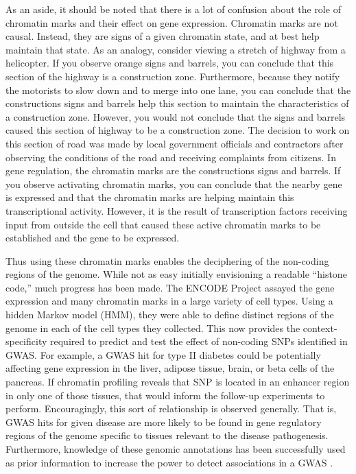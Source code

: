 As an aside, it should be noted that there is a lot of confusion about
the role of chromatin marks and their effect on gene
expression. Chromatin marks are not causal. Instead, they are signs of
a given chromatin state, and at best help maintain that state. As an
analogy, consider viewing a stretch of highway from a helicopter. If
you observe orange signs and barrels, you can conclude that this
section of the highway is a construction zone. Furthermore, because
they notify the motorists to slow down and to merge into one lane, you
can conclude that the constructions signs and barrels help this
section to maintain the characteristics of a construction
zone. However, you would not conclude that the signs and barrels
caused this section of highway to be a construction zone. The decision
to work on this section of road was made by local government officials
and contractors after observing the conditions of the road and
receiving complaints from citizens. In gene regulation, the chromatin
marks are the constructions signs and barrels. If you observe
activating chromatin marks, you can conclude that the nearby gene is
expressed and that the chromatin marks are helping maintain this
transcriptional activity. However, it is the result of transcription
factors receiving input from outside the cell that caused these active
chromatin marks to be established and the gene to be expressed.

Thus using these chromatin marks enables the deciphering of the
non-coding regions of the genome. While not as easy initially
envisioning a readable “histone code,” much progress has been
made. The ENCODE Project assayed the gene expression and many
chromatin marks in a large variety of cell types. Using a hidden
Markov model (HMM), they were able to define distinct regions of the
genome in each of the cell types they collected. This now provides the
context-specificity required to predict and test the effect of
non-coding SNPs identified in GWAS. For example, a GWAS hit for type
II diabetes could be potentially affecting gene expression in the
liver, adipose tissue, brain, or beta cells of the pancreas. If
chromatin profiling reveals that SNP is located in an enhancer region
in only one of those tissues, that would inform the follow-up
experiments to perform. Encouragingly, this sort of relationship is
observed generally. That is, GWAS hits for given disease are more
likely to be found in gene regulatory regions of the genome specific
to tissues relevant to the disease pathogenesis. Furthermore,
knowledge of these genomic annotations has been successfully used as
prior information to increase the power to detect associations in a
GWAS \citep{Wang2016}.


